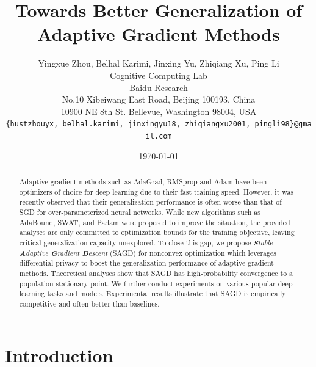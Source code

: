 \documentclass[11pt]{article}
\begin{document}
\title{Towards Better Generalization of Adaptive Gradient Methods}

\author{
  Yingxue Zhou, Belhal Karimi, Jinxing Yu, Zhiqiang Xu, Ping Li\\
  Cognitive Computing Lab\\ 
  Baidu Research\\
  No.10 Xibeiwang East Road, Beijing 100193, China\\  
  10900 NE 8th St. Bellevue, Washington 98004, USA\\
  \texttt{\{hustzhouyx,\ belhal.karimi,\ jinxingyu18,\ zhiqiangxu2001,\  pingli98\}@gmail.com}
}

\date{\today}

\maketitle


\begin{abstract}
Adaptive gradient methods such as AdaGrad, RMSprop and Adam have been optimizers of choice for deep learning due to their fast training speed. However, it was recently observed that their generalization performance is often worse than that of SGD for over-parameterized neural networks. While new algorithms such as AdaBound, SWAT, and Padam were proposed to improve the situation, the provided analyses are only committed to optimization bounds for the training objective, leaving critical generalization capacity unexplored. To close this gap, we propose \textit{\textbf{S}table \textbf{A}daptive \textbf{G}radient \textbf{D}escent} (\textsc{SAGD}) for nonconvex optimization which leverages differential privacy to boost the generalization performance of adaptive gradient methods. 
Theoretical analyses show that \textsc{SAGD} has high-probability convergence to a population stationary point. We further conduct experiments on various popular deep learning tasks and models. Experimental results illustrate that \textsc{SAGD} is empirically competitive and often better than baselines. 
\end{abstract}


\section{Introduction}
\end{document}
